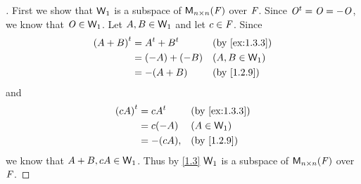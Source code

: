 \begin{proof}[]
  First we show that \(\mathsf{W}_1\) is a subspace of \(\ms[n][n][\F]\) over \(\mathit{F}\).
  Since \({\mathit{O}}^{t} = \mathit{O} = -\mathit{O}\), we know that \(\mathit{O} \in \mathsf{W}_1\).
  Let \(A, B \in \mathsf{W}_1\) and let \(c \in \mathit{F}\).
  Since
  \begin{align*}
    \tp{(A + B)} & = \tp{A} + \tp{B} &  & \by{ex:1.3.3}   \\
                 & = (-A) + (-B)     &  & (A, B \in \W_1) \\
                 & = -(A + B)        &  & \by{1.2.9}
  \end{align*}
  and
  \begin{align*}
    \tp{(cA)} & = c \tp{A} &  & \by{ex:1.3.3} \\
              & = c (-A)   &  & (A \in \W_1)  \\
              & = -(cA),   &  & \by{1.2.9}
  \end{align*}
  we know that \(A + B, cA \in \mathsf{W}_1\).
  Thus by \cref{1.3} \(\mathsf{W}_1\) is a subspace of \(\ms[n][n][\F]\) over \(\mathit{F}\).


\end{proof}
